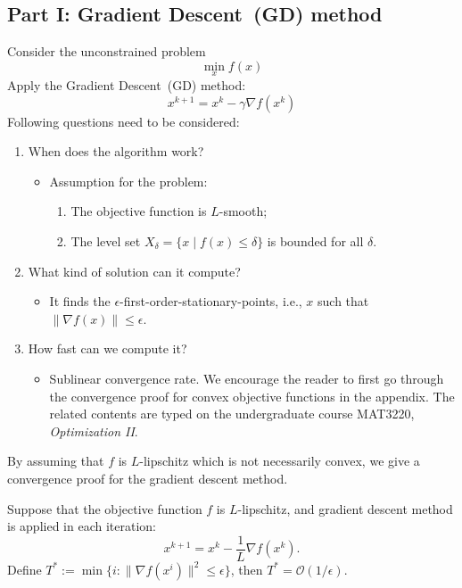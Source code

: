 \subsection{Part I: Gradient Descent~(GD) method}
Consider the unconstrained problem
\[
\min_{x}f(x)
\]
Apply the Gradient Descent~(GD) method:
\[
x^{k+1} = x^k - \gamma\nabla f(x^k)
\]
Following questions need to be considered:
\begin{enumerate}
\item
When does the algorithm work?
\begin{itemize}
\item
Assumption for the problem:
\begin{enumerate}
\item
The objective function is $L$-smooth;
\item
The level set $X_{\delta}=\{x\mid f(x)\le \delta\}$ is bounded for all $\delta$.
\end{enumerate}
\end{itemize}
\item
What kind of solution can it compute?
\begin{itemize}
\item
It finds the $\epsilon$-first-order-stationary-points, i.e., $x$ such that $\|\nabla f(x)\|\le\epsilon$.
\end{itemize}
\item
How fast can we compute it?
\begin{itemize}
\item
Sublinear convergence rate.
We encourage the reader to first go through the convergence proof for convex objective functions in the appendix. The related contents are typed on the undergraduate course MAT3220, \emph{Optimization II}.
\end{itemize}
\end{enumerate}

By assuming that $f$ is $L$-lipschitz which is not necessarily convex, we give a convergence proof for the gradient descent method.
\begin{theorem}
Suppose that the objective function $f$ is $L$-lipschitz, and gradient descent method is applied in each iteration:
\[
x^{k+1} = x^k-\frac{1}{L}\nabla f(x^k).
\]
Define $T^*:=\min\{i: \|\nabla f(x^i)\|^2\le\epsilon\}$, then $T^*=\mathcal{O}(1/\epsilon)$. 
\end{theorem}


